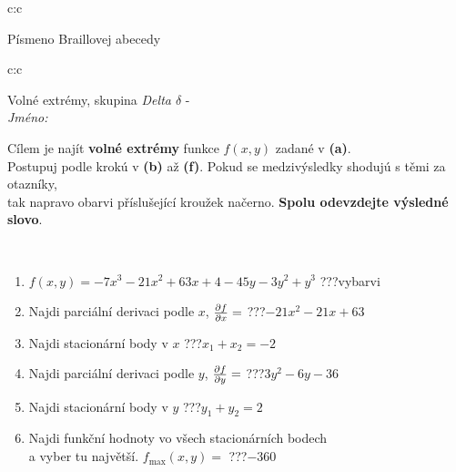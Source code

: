 \documentclass[10pt]{report}
\begin{document}
\begin{tabular}{c:c}
\begin{minipage}[c][104.5mm][t]{0.5\linewidth}
\begin{center}
\begin{minipage}{0.20\linewidth}
\begin{center}
{\small Písmeno Braillovej abecedy}
\end{center}
\end{minipage}
\end{center}
\end{minipage}
%
\end{tabular}
\newpage
\thispagestyle{empty}
\begin{tabular}{c:c}
\begin{minipage}[c][104.5mm][t]{0.5\linewidth}
\begin{center}
\vspace{7mm}
{\huge Volné extrémy, skupina \textit{Delta $\delta$} -}\\[5mm]
\textit{Jméno:}\phantom{xxxxxxxxxxxxxxxxxxxxxxxxxxxxxxxxxxxxxxxxxxxxxxxxxxxxxxxxxxxxxxxxx}\\[5mm]
\begin{minipage}{0.95\linewidth}
\begin{center}
Cílem je najít \textbf{volné extrémy} funkce $f(x,y)$ zadané v \textbf{(a)}.\\Postupuj podle krokú v \textbf{(b)} až \textbf{(f)}. Pokud se medzivýsledky shodujú s těmi za otazníky,\\tak napravo obarvi příslušející kroužek načerno. \textbf{Spolu odevzdejte výsledné slovo}.
\end{center}
\end{minipage}
\\[1mm]
\begin{minipage}{0.79\linewidth}
\begin{center}
\begin{varwidth}{\linewidth}
\begin{enumerate}
\normalsize
\item $f(x,y)=-7x^3-21x^2+63x+4-45y-3y^2+y^3$\quad \dotfill\; ???\;\dotfill \quad vybarvi
\item Najdi parciální derivaci podle $x$, $\pdv{f}{x}=$\quad \dotfill\; ???\;\dotfill \quad $-21x^2-21x+63$
\item Najdi stacionární body v $x$\quad \dotfill\; ???\;\dotfill \quad $x_1+x_2=-2$
\item Najdi parciální derivaci podle $y$, $\pdv{f}{y}=$\quad \dotfill\; ???\;\dotfill \quad $3y^2-6y-36$
\item Najdi stacionární body v $y$\quad \dotfill\; ???\;\dotfill \quad $y_1+y_2=2$
\item Najdi funkční hodnoty vo všech stacionárních bodech \\ \phantom{xxxxxx} a vyber tu najvětší. $f_{\text{max}}(x,y)=$\quad \dotfill\; ???\;\dotfill \quad $-360$

\end{enumerate}
\end{varwidth}
\end{center}
\end{minipage}
\end{center}
\end{minipage}
\end{tabular}
\end{document}
